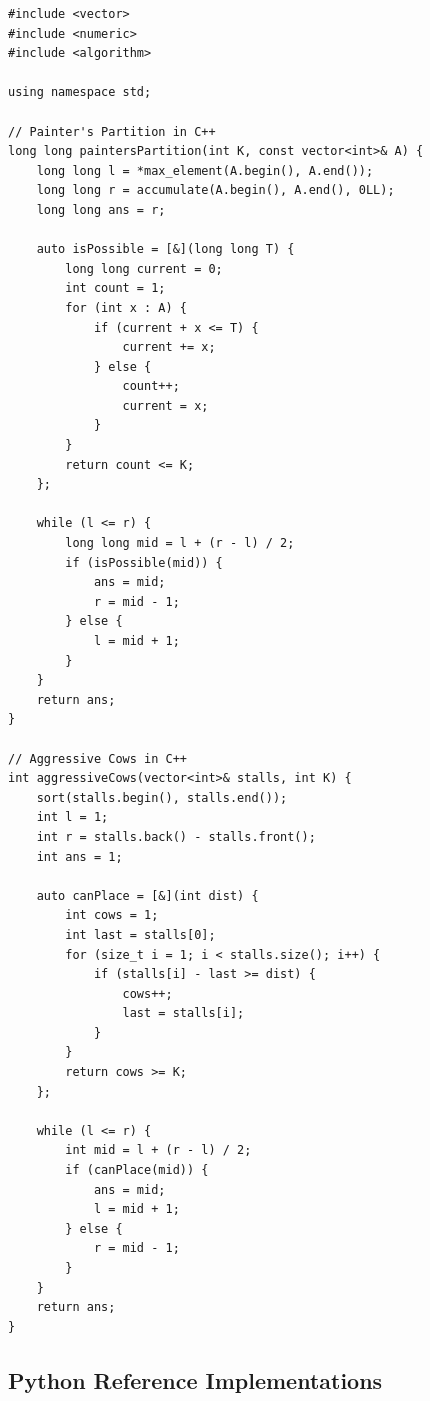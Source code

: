 \documentclass[10pt,journal,compsoc,onecolumn]{IEEEtran}
\begin{document}
{\footnotesize
\begin{verbatim}
#include <vector>
#include <numeric>
#include <algorithm>

using namespace std;

// Painter's Partition in C++
long long paintersPartition(int K, const vector<int>& A) {
    long long l = *max_element(A.begin(), A.end());
    long long r = accumulate(A.begin(), A.end(), 0LL);
    long long ans = r;

    auto isPossible = [&](long long T) {
        long long current = 0;
        int count = 1;
        for (int x : A) {
            if (current + x <= T) {
                current += x;
            } else {
                count++;
                current = x;
            }
        }
        return count <= K;
    };

    while (l <= r) {
        long long mid = l + (r - l) / 2;
        if (isPossible(mid)) {
            ans = mid;
            r = mid - 1;
        } else {
            l = mid + 1;
        }
    }
    return ans;
}

// Aggressive Cows in C++
int aggressiveCows(vector<int>& stalls, int K) {
    sort(stalls.begin(), stalls.end());
    int l = 1;
    int r = stalls.back() - stalls.front();
    int ans = 1;

    auto canPlace = [&](int dist) {
        int cows = 1;
        int last = stalls[0];
        for (size_t i = 1; i < stalls.size(); i++) {
            if (stalls[i] - last >= dist) {
                cows++;
                last = stalls[i];
            }
        }
        return cows >= K;
    };

    while (l <= r) {
        int mid = l + (r - l) / 2;
        if (canPlace(mid)) {
            ans = mid;
            l = mid + 1;
        } else {
            r = mid - 1;
        }
    }
    return ans;
}
\end{verbatim}
}

\subsection{Python Reference Implementations}
\end{document}

